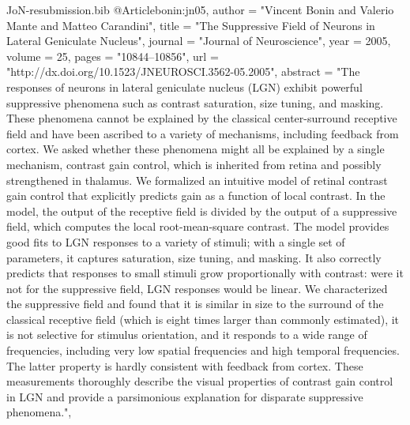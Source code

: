 \documentclass{article}
\begin{document}
\begin{filecontents}{JoN-resubmission.bib}
@Article{bonin:jn05,
  author       = "Vincent Bonin and Valerio Mante and Matteo
                  Carandini",
  title	       = "The Suppressive Field of Neurons in Lateral
                  Geniculate Nucleus",
  journal      = "Journal of Neuroscience",
  year	       = 2005,
  volume       = 25,
  pages	       = "10844--10856",
  url	       = "http://dx.doi.org/10.1523/JNEUROSCI.3562-05.2005",
  abstract     = "The responses of neurons in lateral geniculate
                  nucleus (LGN) exhibit powerful suppressive phenomena
                  such as contrast saturation, size tuning, and
                  masking. These phenomena cannot be explained by the
                  classical center-surround receptive field and have
                  been ascribed to a variety of mechanisms, including
                  feedback from cortex. We asked whether these
                  phenomena might all be explained by a single
                  mechanism, contrast gain control, which is inherited
                  from retina and possibly strengthened in
                  thalamus. We formalized an intuitive model of
                  retinal contrast gain control that explicitly
                  predicts gain as a function of local contrast. In
                  the model, the output of the receptive field is
                  divided by the output of a suppressive field, which
                  computes the local root-mean-square contrast. The
                  model provides good fits to LGN responses to a
                  variety of stimuli; with a single set of parameters,
                  it captures saturation, size tuning, and masking. It
                  also correctly predicts that responses to small
                  stimuli grow proportionally with contrast: were it
                  not for the suppressive field, LGN responses would
                  be linear. We characterized the suppressive field
                  and found that it is similar in size to the surround
                  of the classical receptive field (which is eight
                  times larger than commonly estimated), it is not
                  selective for stimulus orientation, and it responds
                  to a wide range of frequencies, including very low
                  spatial frequencies and high temporal
                  frequencies. The latter property is hardly
                  consistent with feedback from cortex. These
                  measurements thoroughly describe the visual
                  properties of contrast gain control in LGN and
                  provide a parsimonious explanation for disparate
                  suppressive phenomena.",
}


\end{filecontents}
\end{document}
